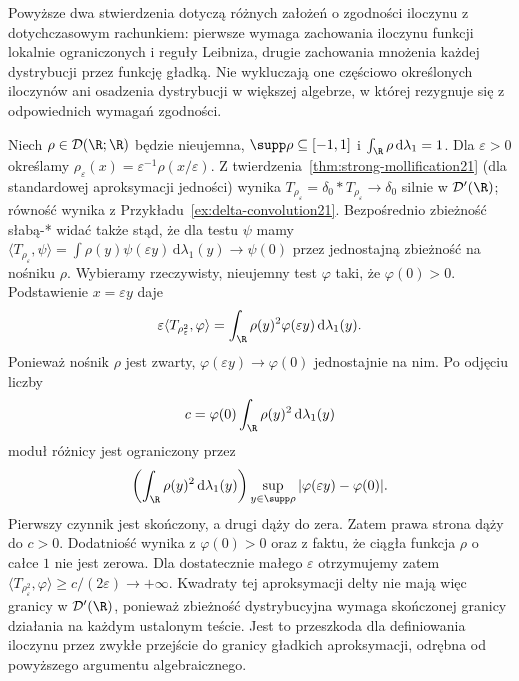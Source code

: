 Powyższe dwa stwierdzenia dotyczą różnych założeń
o zgodności iloczynu z dotychczasowym rachunkiem:
pierwsze wymaga zachowania iloczynu funkcji lokalnie
ograniczonych i reguły Leibniza, drugie zachowania
mnożenia każdej dystrybucji przez funkcję gładką.
Nie wykluczają one częściowo określonych iloczynów
ani osadzenia dystrybucji w większej algebrze,
w której rezygnuje się z odpowiednich wymagań zgodności.

\begin{przyklad}
\label{ex:dt-delta-square}
Niech $\rho\in\mathcal D(\R;\R)$ będzie nieujemna,
$\supp\rho\subseteq[-1,1]$ i
$\int_\R\rho\,\mathrm d\lambda_1=1$.
Dla $\varepsilon>0$ określamy
$\rho_\varepsilon(x)=\varepsilon^{-1}\rho(x/\varepsilon)$.
Z twierdzenia~\ref{thm:strong-mollification21}
(dla standardowej aproksymacji jedności) wynika
$T_{\rho_\varepsilon}=\delta_0*T_{\rho_\varepsilon}
\to\delta_0$ silnie w $\mathcal D'(\R)$;
równość wynika z Przykładu~\ref{ex:delta-convolution21}.
Bezpośrednio zbieżność słabą-* widać także stąd, że
dla testu $\psi$ mamy
$\langle T_{\rho_\varepsilon},\psi\rangle=
\int\rho(y)\psi(\varepsilon y)\,\mathrm d\lambda_1(y)
\to\psi(0)$ przez jednostajną zbieżność na nośniku $\rho$.
Wybieramy rzeczywisty, nieujemny test $\varphi$
taki, że $\varphi(0)>0$.
Podstawienie $x=\varepsilon y$ daje
\[
 \varepsilon\langle T_{\rho_\varepsilon^2},\varphi\rangle
 =\int_\R \rho(y)^2\varphi(\varepsilon y)\,
 \mathrm d\lambda_1(y).
\]
Ponieważ nośnik $\rho$ jest zwarty,
$\varphi(\varepsilon y)\to\varphi(0)$ jednostajnie
na nim. Po odjęciu liczby
\[
 c=\varphi(0)\int_\R\rho(y)^2\,\mathrm d\lambda_1(y)
\]
moduł różnicy jest ograniczony przez
\[
 \left(\int_\R\rho(y)^2\,\mathrm d\lambda_1(y)\right)
 \sup_{y\in\supp\rho}|\varphi(\varepsilon y)-\varphi(0)|.
\]
Pierwszy czynnik jest skończony, a drugi dąży
do zera. Zatem prawa strona dąży do $c>0$.
Dodatniość wynika z $\varphi(0)>0$ oraz z faktu,
że ciągła funkcja $\rho$ o całce $1$ nie jest zerowa.
Dla dostatecznie małego $\varepsilon$ otrzymujemy
zatem
$\langle T_{\rho_\varepsilon^2},\varphi\rangle
\ge c/(2\varepsilon)\to+\infty$.
Kwadraty tej aproksymacji delty nie mają więc
granicy w $\mathcal D'(\R)$, ponieważ zbieżność
dystrybucyjna wymaga skończonej granicy działania
na każdym ustalonym teście.
Jest to przeszkoda dla definiowania iloczynu
przez zwykłe przejście do granicy gładkich
aproksymacji, odrębna od powyższego argumentu
algebraicznego.
\end{przyklad}
